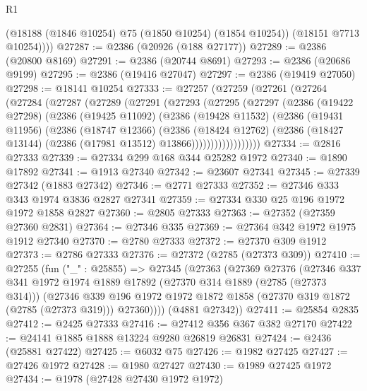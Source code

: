 \begin{lexlean}{R1}
\begin{coremodule}
          (@18188 (@1846 @10254) @75 (@1850 @10254) (@1854 @10254))
          (@18151 @7713 @10254))))
@27287 := @2386 (@20926 (@188 @27177))
@27289 := @2386 (@20800 @8169)
@27291 := @2386 (@20744 @8691)
@27293 := @2386 (@20686 @9199)
@27295 := @2386 (@19416 @27047)
@27297 := @2386 (@19419 @27050)
@27298 := @18141 @10254
@27333 := @27257
    (@27259
      (@27261
        (@27264
          (@27284
            (@27287
              (@27289
                (@27291
                  (@27293
                    (@27295
                      (@27297
                        (@2386
                          (@19422 @27298)
                          (@2386
                            (@19425 @11092)
                            (@2386
                              (@19428 @11532)
                              (@2386
                                (@19431 @11956)
                                (@2386
                                  (@18747 @12366)
                                  (@2386
                                    (@18424 @12762)
                                    (@2386
                                      (@18427 @13144)
                                      (@2386 (@17981 @13512) @13866))))))))))))))))))
@27334 := @2816 @27333
@27339 := @27334 @299 @168 @344 @25282 @1972
@27340 := @1890 @17892
@27341 := @1913 @27340
@27342 := @23607 @27341
@27345 := @27339 @27342 (@1883 @27342)
@27346 := @2771 @27333
@27352 := @27346 @333 @343 @1974 @3836 @2827 @27341
@27359 := @27334 @330 @25 @196 @1972 @1972 @1858 @2827
@27360 := @2805 @27333
@27363 := @27352 (@27359 @27360 @2831)
@27364 := @27346 @335
@27369 := @27364 @342 @1972 @1975 @1912 @27340
@27370 := @2780 @27333
@27372 := @27370 @309 @1912
@27373 := @2786 @27333
@27376 := @27372 (@2785 (@27373 @309))
@27410 := @27255
    (fun ("_" : @25855) =>
    @27345
      (@27363
        (@27369
          @27376
          (@27346
            @337
            @341
            @1972
            @1974
            @1889
            @17892
            (@27370 @314 @1889 (@2785 (@27373 @314)))
            (@27346
              @339
              @196
              @1972
              @1972
              @1872
              @1858
              (@27370 @319 @1872 (@2785 (@27373 @319)))
              @27360))))
      (@4881 @27342))
@27411 := @25854 @2835
@27412 := @2425 @27333
@27416 := @27412 @356 @367 @382 @27170
@27422 := @24141 @1885 @1888 @13224 @9280 @26819 @26831
@27424 := @2436 (@25881 @27422)
@27425 := @6032 @75
@27426 := @1982 @27425
@27427 := @27426 @1972
@27428 := @1980 @27427
@27430 := @1989 @27425 @1972
@27434 := @1978 (@27428 @27430 @1972 @1972)

\end{coremodule}
\end{lexlean}
